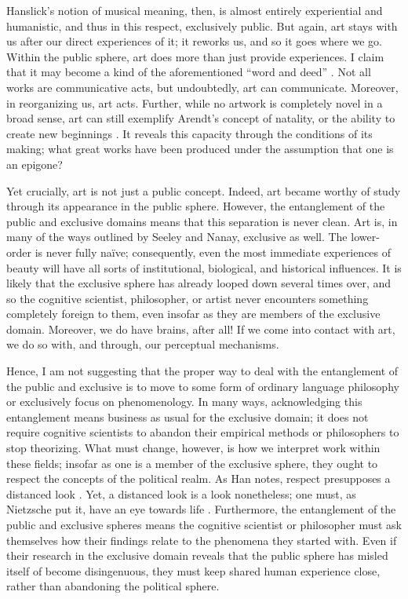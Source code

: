 \documentclass[12pt,letterpaper]{article}
\begin{document}
Hanslick's notion of musical meaning, then, is almost entirely experiential and
humanistic, and thus in this respect, exclusively public. But again, art stays
with us after our direct experiences of it; it reworks us, and so it goes where
we go. Within the public sphere, art does more than just provide experiences. I
claim that it may become a kind of the aforementioned ``word and deed''
\autocite[148]{arendtFuture1968}. Not all works are communicative acts, but
undoubtedly, art can communicate. Moreover, in reorganizing us, art acts.
Further, while no artwork is completely novel in a broad sense, art can still
exemplify Arendt's concept of natality, or the ability to create new beginnings
\autocite[9]{arendtHuman2018}. It reveals this capacity through the conditions
of its making; what great works have been produced under the assumption that one
is an epigone?

Yet crucially, art is not just a public concept. Indeed, art became worthy of
study through its appearance in the public sphere. However, the entanglement of
the public and exclusive domains means that this separation is never clean. Art
is, in many of the ways outlined by Seeley and Nanay, exclusive as well. The
lower-order is never fully naïve; consequently, even the most immediate
experiences of beauty will have all sorts of institutional, biological, and
historical influences. It is likely that the exclusive sphere has already looped
down several times over, and so the cognitive scientist, philosopher, or artist
never encounters something completely foreign to them, even insofar as they are
members of the exclusive domain. Moreover, we do have brains, after all! If we
come into contact with art, we do so with, and through, our perceptual
mechanisms.

Hence, I am not suggesting that the proper way to deal with the entanglement of
the public and exclusive is to move to some form of ordinary language philosophy
or exclusively focus on phenomenology. In many ways, acknowledging this
entanglement means business as usual for the exclusive domain; it does not
require cognitive scientists to abandon their empirical methods or philosophers
to stop theorizing. What must change, however, is how we interpret work within
these fields; insofar as one is a member of the exclusive sphere, they ought to
respect the concepts of the political realm. As Han notes, respect presupposes a
distanced look \autocite[1]{hanSwarm2017}. Yet, a distanced look is a look
nonetheless; one must, as Nietzsche put it, have an eye towards life
\autocite[100--101]{nietzscheUnfashionable1995}. Furthermore, the entanglement
of the public and exclusive spheres means the cognitive scientist or philosopher
must ask themselves how their findings relate to the phenomena they started
with. Even if their research in the exclusive domain reveals that the public
sphere has misled itself of become disingenuous, they must keep shared human
experience close, rather than abandoning the political sphere.

\newpage
\printbibliography
\end{document}
